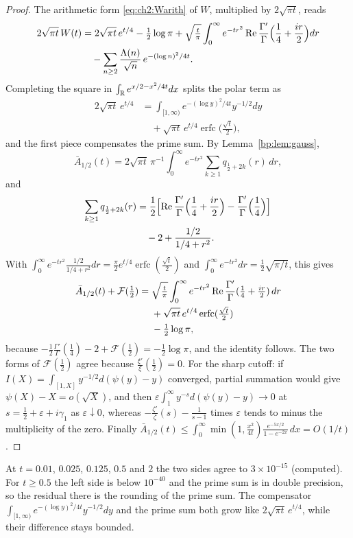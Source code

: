 \begin{proof}
The arithmetic form \eqref{eq:ch2:Warith} of $W$, multiplied by $2\sqrt{\pi t}$, reads
\[
\begin{split}2\sqrt{\pi t}\,W(t)&=2\sqrt{\pi t}\,e^{t/4}-\tfrac12\log\pi+\sqrt{\tfrac t\pi}\int_0^\infty e^{-tr^2}\operatorname{Re}\frac{\Gamma'}{\Gamma}\Bigl(\frac14+\frac{ir}2\Bigr)dr\\&\quad-\sum_{n\ge2}\frac{\Lambda(n)}{\sqrt n}\,e^{-(\log n)^2/4t}.\end{split}
\]
Completing the square in $\int_{\mathbb{R}}e^{x/2-x^2/4t}dx$ splits the polar term as\[\begin{split}2\sqrt{\pi t}\,e^{t/4}&=\int_{[1,\infty)}e^{-(\log y)^2/4t}y^{-1/2}dy\\&\quad+\sqrt{\pi t}\,e^{t/4}\operatorname{erfc}\bigl(\tfrac{\sqrt t}2\bigr),\end{split}\]and the first piece compensates the prime sum. By Lemma~\ref{bp:lem:gauss},\[\bar A_{1/2}(t)=2\sqrt{\pi t}\,\pi^{-1}\int_0^\infty e^{-tr^2}\sum_{k\ge1}q_{\frac12+2k}(r)\,dr,\]and
\[\begin{split}\sum_{k\ge1}q_{\frac12+2k}(r)&=\frac12\Bigl[\operatorname{Re}\frac{\Gamma'}{\Gamma}\Bigl(\frac14+\frac{ir}2\Bigr)-\frac{\Gamma'}{\Gamma}\Bigl(\frac14\Bigr)\Bigr]\\&\quad-2+\frac{1/2}{1/4+r^2}.\end{split}\]
With $\int_0^\infty e^{-tr^2}\frac{1/2}{1/4+r^2}dr=\frac\pi2e^{t/4}\operatorname{erfc}(\frac{\sqrt t}2)$ and $\int_0^\infty e^{-tr^2}dr=\frac12\sqrt{\pi/t}$, this gives
\[\begin{split}\bar A_{1/2}(t)+\mathcal F(\tfrac12)={}&\sqrt{\tfrac t\pi}\int_0^\infty e^{-tr^2}\operatorname{Re}\frac{\Gamma'}{\Gamma}(\tfrac14+\tfrac{ir}2)\,dr\\&+\sqrt{\pi t}\,e^{t/4}\operatorname{erfc}(\tfrac{\sqrt t}2)\\&-\tfrac12\log\pi,\end{split}\]
because $-\frac12\frac{\Gamma'}{\Gamma}(\frac14)-2+\mathcal F(\frac12)=-\frac12\log\pi$, and the identity follows. The two forms of $\mathcal F(\frac12)$ agree because $\frac{\xi'}{\xi}(\frac12)=0$. For the sharp cutoff: if $I(X)=\int_{[1,X]}y^{-1/2}d(\psi(y)-y)$ converged, partial summation would give $\psi(X)-X=o(\sqrt X)$, and then $\varepsilon\int_1^\infty y^{-s}d(\psi(y)-y)\to0$ at $s=\frac12+\varepsilon+i\gamma_1$ as $\varepsilon\downarrow0$, whereas $-\frac{\zeta'}{\zeta}(s)-\frac1{s-1}$ times $\varepsilon$ tends to minus the multiplicity of the zero. Finally $\bar A_{1/2}(t)\le\int_0^\infty\min(1,\frac{x^2}{4t})\frac{e^{-5x/2}}{1-e^{-2x}}\,dx=O(1/t)$.
\end{proof}
At $t=0.01$, $0.025$, $0.125$, $0.5$ and $2$ the two sides agree to $3\times10^{-15}$ (computed). For $t\ge0.5$ the left side is below $10^{-40}$ and the prime sum is in double precision, so the residual there is the rounding of the prime sum.
The compensator $\int_{[1,\infty)}e^{-(\log y)^2/4t}y^{-1/2}dy$ and the prime sum both grow like $2\sqrt{\pi t}\,e^{t/4}$, while their difference stays bounded.
